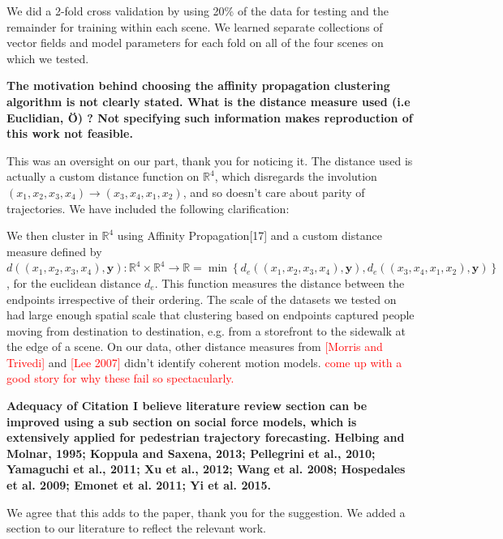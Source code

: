 \documentclass[usenames,dvipsnames]{article}
\newcommand{\todo}[1]{\textcolor{red}{#1}}
\providecommand{\response}[1]{
\noindent
\noindent\colorbox{gray!20}{
\parbox{\textwidth}{
\setlength{\parskip}{.1in}
\setlength{\parindent}{.1in}
#1}
}
}
\begin{document}
\begin{enumerate}
\response{We did a 2-fold cross validation by using 20\% of the data for testing and the remainder for training within each scene. We learned separate collections of vector fields and model parameters for each fold on all of the four scenes on which we tested.}


\begin{item}
\textbf{The motivation behind choosing the affinity propagation clustering
algorithm is not clearly stated. 
What is the distance measure used (i.e Euclidian, Ö) ? Not specifying
such information makes reproduction of this work not feasible. }

This was an oversight on our part, thank you for noticing it. The distance used is actually a custom distance function on $\mathbb{R}^4$, which disregards the involution $(x_1, x_2, x_3, x_4) \to (x_3, x_4, x_1, x_2)$, and so doesn't care about parity of trajectories. We have included the following clarification:

\response{We then cluster in $\mathbb{R}^4$ using Affinity Propagation[17] and a custom distance measure defined by $d((x_1, x_2, x_3, x_4),\mathbf{y}) : \mathbb{R}^4 \times \mathbb{R}^4 \to \mathbb{R} = \min \left\{ d_e((x_1, x_2, x_3, x_4), \mathbf{y}), d_e((x_3, x_4, x_1, x_2), \mathbf{y}) \right\}$, for the euclidean distance $d_e$. This function measures the distance between the endpoints irrespective of their ordering. The scale of the datasets we tested on had large enough spatial scale that clustering based on endpoints captured people moving from destination to destination, e.g. from a storefront to the sidewalk at the edge of a scene. On our data, other distance measures from \todo{[Morris and Trivedi]} and \todo{[Lee 2007]} didn't identify coherent motion models. \todo{come up with a good story for why these fail so spectacularly.}}
	
\end{item}

\begin{item}
\textbf{Adequacy of Citation
I believe literature review section can be improved using a sub section
on social force models, which is extensively applied for pedestrian
trajectory forecasting. 
Helbing and Molnar, 1995; Koppula and Saxena, 2013; Pellegrini et al.,
2010; Yamaguchi et al., 2011; Xu et al., 2012; Wang et al. 2008;
Hospedales et al. 2009; Emonet et al. 2011; Yi et al. 2015.}
\end{item}

We agree that this adds to the paper, thank you for the suggestion. We added a section to our literature to reflect the relevant work.


\end{enumerate}
\end{document}
